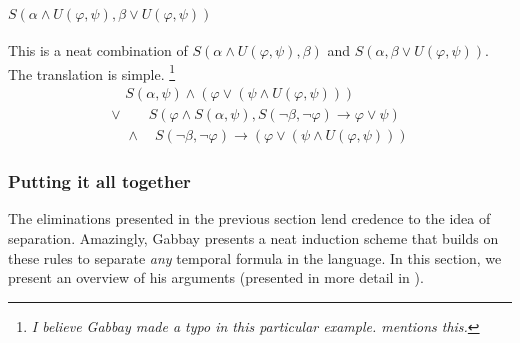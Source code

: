 \documentclass[a4paper,UKenglish,cleveref, autoref, thm-restate, numberwithinsect]{lipics-v2021}
\begin{document}
\paragraph*{$S(\alpha \land U(\varphi,\psi), \beta \lor U(\varphi, \psi))$}
This is a neat combination of $S(\alpha \land U(\varphi, \psi), \beta)$ and $S(\alpha, \beta \lor U(\varphi, \psi))$. The translation is simple. \footnote{\textit{I believe Gabbay made a typo in this particular example. \cite{xpathComplete} mentions this.}}
\begin{equation*}
    \begin{aligned}
        \quad S(\alpha, \psi) \land (\varphi \lor (\psi \land U(\varphi, \psi))) \\
        \lor \quad \quad S(\varphi \land S(\alpha, \psi), S(\lnot \beta, \lnot \varphi) \to \varphi \lor \psi)\\
        \quad \land \quad S(\lnot \beta, \lnot \varphi) \to (\varphi \lor (\psi \land U(\varphi, \psi)))
    \end{aligned}
\end{equation*}

\subsubsection{Putting it all together}

The eliminations presented in the previous section lend credence to the idea of separation. Amazingly, Gabbay presents a neat induction scheme that builds on these rules to separate \textit{any} temporal formula in the language. In this section, we present an overview of his arguments (presented in more detail in \cite{gabbay1994}).
\end{document}
